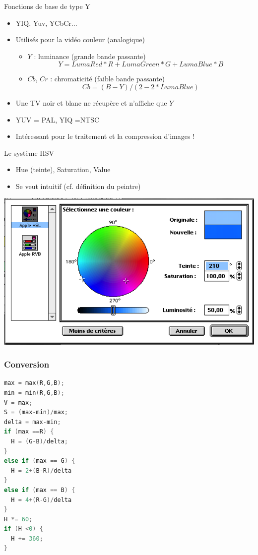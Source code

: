 \begin{frame}{Fonctions de base de type Y}
\begin{itemize}
\item YIQ, Yuv, YCbCr...
\item Utilisés pour la vidéo couleur (analogique)
\begin{itemize}
\item $Y$ : luminance (grande bande passante)
$$Y = LumaRed*R + LumaGreen*G + LumaBlue*B$$
\item $Cb$, $Cr$ : chromaticité (faible bande passante)
$$Cb = (B-Y)/(2-2*LumaBlue)$$
\end{itemize}
\item Une TV noir et blanc ne récupère et n'affiche que $Y$
\item YUV = PAL, YIQ =NTSC
\item Intéressant pour le traitement et la compression d'images !
\end{itemize}
\end{frame}

\begin{frame}{Le système HSV}
\begin{itemize}
\item Hue (teinte), Saturation, Value
\item Se veut intuitif (cf. définition du peintre)
\end{itemize}
\begin{center}
\includegraphics[height=.5\textheight]{figs/hsv.png}

\end{center}
\end{frame}

\begin{frame}[fragile]
\frametitle{Conversion}
\begin{lstlisting}[language=C++]
max = max(R,G,B);
min = min(R,G,B);
V = max;
S = (max-min)/max;
delta = max-min;
if (max ==R) {
  H = (G-B)/delta;
}
else if (max == G) {
  H = 2+(B-R)/delta
}
else if (max == B) {
  H = 4+(R-G)/delta
}
H *= 60;
if (H <0) {
  H += 360;
}
\end{lstlisting}
\end{frame}


